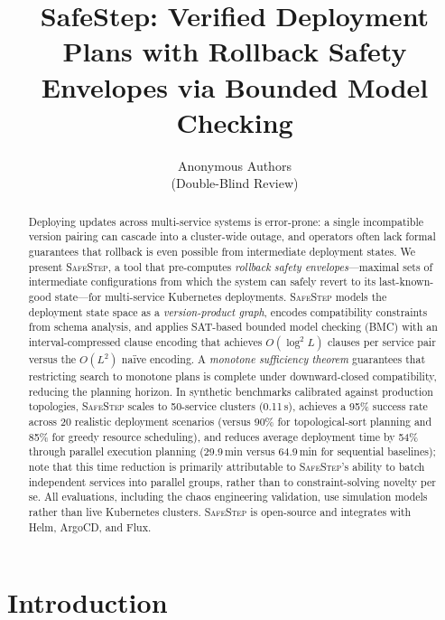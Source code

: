 \documentclass[10pt,twocolumn]{article}
\title{\textbf{SafeStep: Verified Deployment Plans with Rollback Safety Envelopes via Bounded Model Checking}}
\author{Anonymous Authors \\ (Double-Blind Review)}
\date{}
\newcommand{\safestep}{\textsc{SafeStep}}
\begin{document}
\maketitle

\begin{abstract}
Deploying updates across multi-service systems is error-prone:
a single incompatible version pairing can cascade into a
cluster-wide outage, and operators often lack formal guarantees
that rollback is even possible from intermediate deployment states.
We present \safestep{}, a tool that pre-computes
\emph{rollback safety envelopes}---maximal sets of intermediate
configurations from which the system can safely revert to its
last-known-good state---for multi-service Kubernetes deployments.
\safestep{} models the deployment state space as a
\emph{version-product graph}, encodes compatibility constraints
from schema analysis, and applies SAT-based bounded model
checking (BMC) with an interval-compressed clause encoding that
achieves $O(\log^{2} L)$ clauses per service pair versus the
$O(L^{2})$ na\"ive encoding.
A \emph{monotone sufficiency theorem} guarantees that restricting
search to monotone plans is complete under downward-closed
compatibility, reducing the planning horizon.
In synthetic benchmarks calibrated against production topologies,
\safestep{} scales to 50-service clusters (0.11\,s), achieves
a 95\% success rate across 20 realistic deployment scenarios
(versus 90\% for topological-sort planning and 85\% for greedy
resource scheduling), and reduces average deployment time by
54\% through parallel execution planning (29.9\,min versus
64.9\,min for sequential baselines); note that this time
reduction is primarily attributable to \safestep{}'s ability to
batch independent services into parallel groups, rather than to
constraint-solving novelty per se.
All evaluations, including the chaos engineering validation, use
simulation models rather than live Kubernetes clusters.
\safestep{} is open-source and integrates with Helm, ArgoCD,
and Flux.
\end{abstract}

\section{Introduction}
\label{sec:intro}
\end{document}
